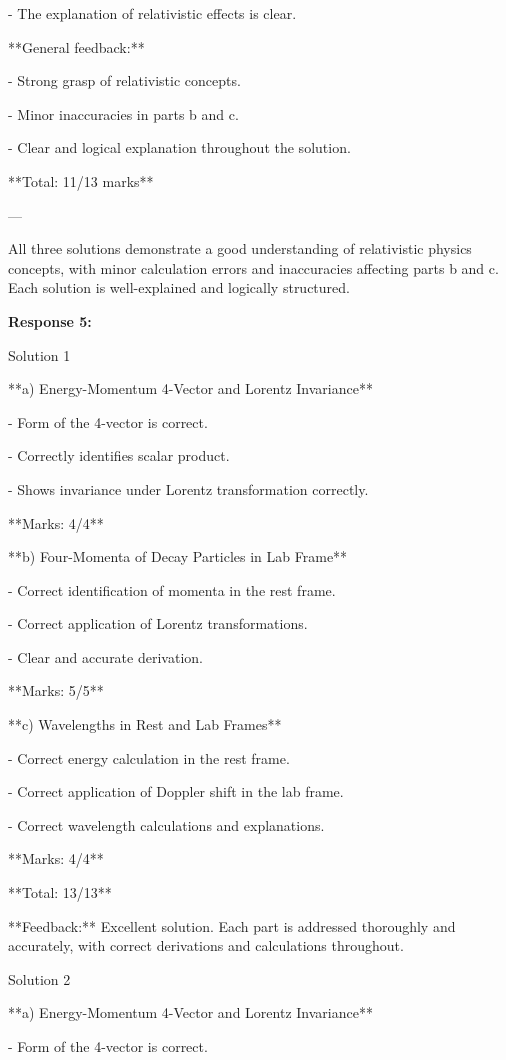 \documentclass[a4paper,11pt]{article}
\begin{document}
- The explanation of relativistic effects is clear.

**General feedback:**

- Strong grasp of relativistic concepts.

- Minor inaccuracies in parts b and c.

- Clear and logical explanation throughout the solution.

**Total: 11/13 marks**

---

All three solutions demonstrate a good understanding of relativistic physics concepts, with minor calculation errors and inaccuracies affecting parts b and c. Each solution is well-explained and logically structured.

\bigskip
\textbf{Response 5:}

Solution 1

**a) Energy-Momentum 4-Vector and Lorentz Invariance**

- Form of the 4-vector is correct.

- Correctly identifies scalar product.

- Shows invariance under Lorentz transformation correctly.

**Marks: 4/4**

**b) Four-Momenta of Decay Particles in Lab Frame**

- Correct identification of momenta in the rest frame.

- Correct application of Lorentz transformations.

- Clear and accurate derivation.

**Marks: 5/5**

**c) Wavelengths in Rest and Lab Frames**

- Correct energy calculation in the rest frame.

- Correct application of Doppler shift in the lab frame.

- Correct wavelength calculations and explanations.

**Marks: 4/4**

**Total: 13/13**

**Feedback:** Excellent solution. Each part is addressed thoroughly and accurately, with correct derivations and calculations throughout.

Solution 2

**a) Energy-Momentum 4-Vector and Lorentz Invariance**

- Form of the 4-vector is correct.
\end{document}
